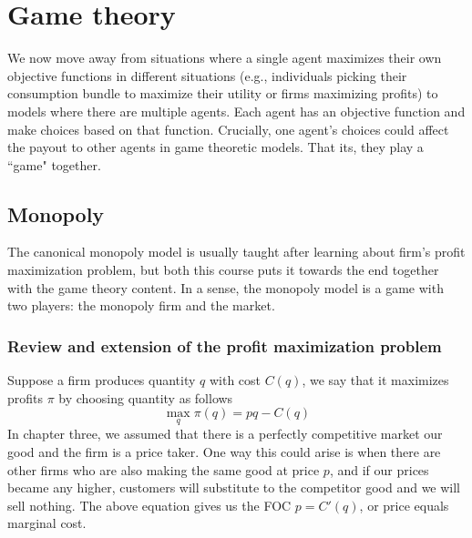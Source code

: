 \chapter{Game theory}
We now move away from situations where a single agent maximizes their own objective functions in different situations (e.g., individuals picking their consumption bundle to maximize their utility or firms maximizing profits) to models where there are multiple agents. Each agent has an objective function and make choices based on that function. Crucially, one agent's choices could affect the payout to other agents in game theoretic models. That its, they play a ``game" together.

\section{Monopoly}
The canonical monopoly model is usually taught after learning about firm's profit maximization problem, but both this course puts it towards the end together with the game theory content. In a sense, the monopoly model is a game with two players: the monopoly firm and the market. 
\subsection*{Review and extension of the profit maximization problem}
Suppose a firm produces quantity $q$ with cost $C(q)$, we say that it maximizes profits $\pi$ by choosing quantity as follows
\begin{equation}
    \max_q \pi(q) = pq - C(q) \label{gt:originaleq} 
\end{equation}
In chapter three, we assumed that there is a perfectly competitive market our good and the firm is a price taker. One way this could arise is when there are other firms who are also making the same good at price $p$, and if our prices became any higher, customers will substitute to the competitor good and we will sell nothing. The above equation gives us the FOC $p = C'(q)$, or price equals marginal cost.

